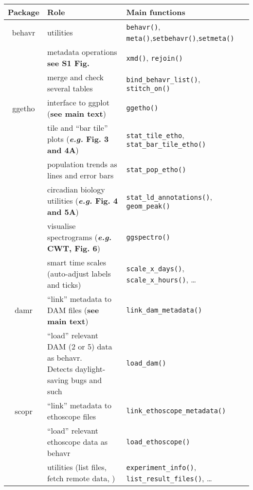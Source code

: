 \documentclass{standalone}
\begin{document}
\begin{tabular}{|l|l|l|}
	\hline
	Package & Role & Main functions \\ \hline \hline
	\multicolumn{ 1}{|c|}{behavr} & utilities & \texttt{behavr()}, \texttt{meta()},\texttt{setbehavr()},\texttt{setmeta()} \\ \cline{ 2- 3}
	\multicolumn{ 1}{|l|}{} & metadata operations \textbf{see S1 Fig.} & \texttt{xmd()}, \texttt{rejoin()} \\ \cline{ 2- 3}
	\multicolumn{ 1}{|l|}{} & merge and check several tables & \texttt{bind\_behavr\_list()}, \texttt{stitch\_on()} \\ \hline
	\multicolumn{ 1}{|c|}{ggetho} & interface to ggplot (\textbf{see main text}) & \texttt{ggetho()} \\ \cline{ 2- 3}
	\multicolumn{ 1}{|c|}{} & tile and ``bar tile'' plots (\textbf{\emph{e.g.} Fig. 3 and 4A}) & \texttt{stat\_tile\_etho}, \texttt{stat\_bar\_tile\_etho()} \\ \cline{ 2- 3}
	\multicolumn{ 1}{|l|}{} & population trends as lines and error bars & \texttt{stat\_pop\_etho()} \\ \cline{ 2- 3}
	\multicolumn{ 1}{|l|}{} & circadian biology utilities (\textbf{\emph{e.g.} Fig. 4 and 5A}) & \texttt{stat\_ld\_annotations()}, \texttt{geom\_peak()} \\ \cline{ 2- 3}
	\multicolumn{ 1}{|l|}{} & visualise spectrograms (\textbf{\emph{e.g.} CWT, Fig. 6}) & \texttt{ggspectro()} \\ \cline{ 2- 3}
	\multicolumn{ 1}{|l|}{} & smart time scales (auto-adjust labels and ticks) & \texttt{scale\_x\_days()}, \texttt{scale\_x\_hours()}, \dots\\ \hline
	\multicolumn{ 1}{|c|}{damr} & ``link'' metadata to DAM files (\textbf{see main text}) & \texttt{link\_dam\_metadata()} \\ \cline{ 2- 3}
	\multicolumn{ 1}{|l|}{} & \makecell[vl]{``load'' relevant DAM (2 or 5) data as behavr.\\Detects daylight-saving bugs and such} & \texttt{load\_dam()} \\ \hline
	\multicolumn{ 1}{|c|}{scopr} & ``link'' metadata to ethoscope files & \texttt{link\_ethoscope\_metadata()} \\ \cline{ 2- 3}
	\multicolumn{ 1}{|l|}{} & ``load'' relevant ethoscope data as behavr & \texttt{load\_ethoscope()} \\ \cline{ 2- 3}
	\multicolumn{ 1}{|l|}{} & utilities (list files, fetch remote data, ) & \texttt{experiment\_info()}, \texttt{list\_result\_files()}, \dots \\ \hline

\end{tabular}
\end{document}
